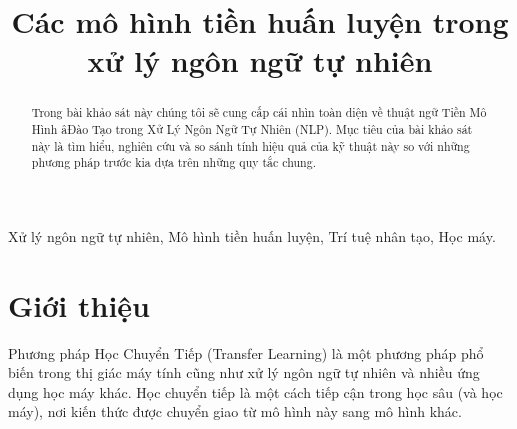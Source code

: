 \documentclass[conference]{IEEEtran}
\begin{document}
\title{Các mô hình tiền huấn luyện trong xử lý ngôn ngữ tự nhiên}

\author{
\and

\and

\and

}

\maketitle

\begin{abstract}
Trong bài khảo sát này chúng tôi sẽ cung cấp cái nhìn toàn diện về thuật ngữ Tiền Mô Hình âĐào Tạo trong Xử Lý Ngôn Ngữ Tự Nhiên (NLP). Mục tiêu của bài khảo sát này là tìm hiểu, nghiên cứu và so sánh tính hiệu quả của kỹ thuật này so với những phương pháp trước kia dựa trên những quy tắc chung.     
\end{abstract}

\begin{IEEEkeywords}
Xử lý ngôn ngữ tự nhiên, Mô hình tiền huấn luyện, Trí tuệ nhân tạo, Học máy.
\end{IEEEkeywords}

\section{Giới thiệu}
Phương pháp Học Chuyển Tiếp (Transfer Learning) là một phương pháp phổ biến trong thị giác máy tính cũng như xử lý ngôn ngữ tự nhiên và nhiều ứng dụng học máy khác. Học chuyển tiếp là một cách tiếp cận trong học sâu (và học máy), nơi kiến thức được chuyển giao từ mô hình này sang mô hình khác.
\end{document}
